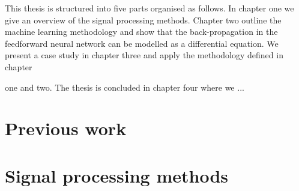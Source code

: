 \documentclass[11pt, oneside]{article}   	%
\begin{document}
\begin{flushleft}
This thesis is structured into five parts organised as follows. In chapter one we give an overview of the signal processing methods. Chapter two outline the machine learning methodology and show that the back-propagation in the feedforward neural network can be modelled as a differential equation.
We present a case study in chapter three and apply the methodology defined in chapter

 one and two. The thesis is concluded in chapter four where we ...
\end{flushleft}


\section{Previous work}

\section{Signal processing methods}
\end{document}
